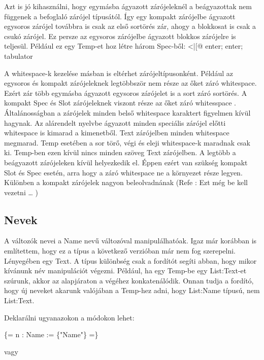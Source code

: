 {Azt is jó kihasználni, hogy egymásba ágyazott zárójeleknél a beágyazottak nem függenek a befoglaló zárójel típusától. 
Így egy kompakt zárójelbe ágyazott egysoros zárójel továbbra is csak az első sortörés zár, ahogy a blokkosat is csak a csukó zárójel. \todo{Ezt nem értem, és ez baj, mert az tényleg fontos, hogy pl. \texttt{<|[\$}-t lezárja-e az első space.} 
Ez persze az egysoros zárójelbe ágyazott blokkos zárójelre is teljesül. 
Például ez egy Temp-et hoz létre három Spec-ből: <|[@ enter; enter; tabulator

A whitespace-k kezelése másban is eltérhet zárójeltípusonként. 
Például az egysoros és kompakt zárójeleknek legtöbbször nem része az őket záró whitespace. 
Ezért zár több egymásba ágyazott egysoros zárójelet is a sort záró sortörés. 
A kompakt Spec és Slot zárójeleknek viszont része az őket záró whitesspace .
Általánosságban a zárójelek minden belső whitespace karaktert figyelmen kívül hagynak. 
Az alárendelt nyelvbe ágyazott minden speciális zárójel előtti whitespace is kimarad a kimenetből. 
Text zárójelben minden whitespace megmarad. 
Temp esetében a sor törő, végi és eleji whitespace-k maradnak csak ki. 
Temp-ben ezen kívül nincs minden szöveg Text zárójelben. 
A legtöbb a beágyazott zárójeleken kívül helyezkedik el. 
Éppen ezért van szükség kompakt Slot és Spec esetén, arra hogy a záró whitespace ne a környezet része legyen. 
Különben a kompakt zárójelek nagyon beleolvadnának (Refe : Ezt még be kell vezetni … )


\subsection{Nevek}
A változók nevei a Name nevű változóval manipulálhatóak.
Igaz már korábban is említettem, hogy ez a típus a következő verzióban már nem fog szerepelni.
Lényegében egy Text.
A típus különbség csak a fordítót segíti abban, hogy mikor kívánunk név manipulációt végezni.
Például, ha egy Temp-be egy List:Text-et szúrunk, akkor az alapjáraton a végéhez konkatenálódik.
Onnan tudja a fordító, hogy új neveket akarunk valójában a Temp-hez adni, hogy List:Name típusú, nem List:Text.

Deklarálni ugyanazokon a módokon lehet:

\{= n : Name := \{"Name"\} =\}

vagy

}
